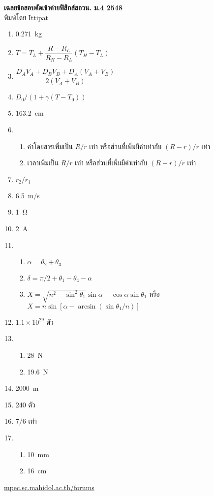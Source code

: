 \documentclass[a4paper,12pt]{article}
\begin{document}
\thispagestyle{empty}
\begin{center}
	{\huge \textbf{เฉลยข้อสอบคัดเข้าค่ายฟิสิกส์สอวน. ม.\textenglish{4} 2548}}\\
	พิมพ์โดย Ittipat\\
\end{center}
\begin{enumerate}
	\item \SI{0.271}{kg}
	\item \(T = T_L + \dfrac{R-R_L}{R_H - R_L} (T_H - T_L)\)
	\item \(\dfrac{D_AV_A + D_BV_B + D_A(V_A + V_B)}{2(V_A + V_B)}\)
	\item \(D_0/(1 + \gamma (T - T_0))\)
	\item \SI{163.2}{cm}
	\item \
	\begin{enumerate}
		\item ค่าโดยสารเพิ่มเป็น \(R/r\) เท่า หรือส่วนที่เพิ่มมีค่าเท่ากับ  \((R-r)/r\) เท่า
		\item เวลาเพิ่มเป็น \(R/r\) เท่า หรือส่วนที่เพิ่มมีค่าเท่ากับ  \((R-r)/r\) เท่า
	\end{enumerate}
	\item \(r_2/r_1\)
	\item \SI{6.5}{m/s}
	\item \SI{1}{\ohm}
	\item \SI{2}{A}
	\item \
	\begin{enumerate}
		\item \(\alpha = \theta_2 +\theta_3\)
		\item \(\delta = \pi/2 + \theta_1 - \theta_4 - \alpha\)
		\item \(X = \sqrt{n^2 -\sin^2 \theta_1} \sin \alpha - \cos \alpha \sin \theta_1\) หรือ \(X = n \sin[\alpha - \arcsin (\sin \theta_1 / n)]\)
	\end{enumerate}
	\item \(1.1\times10^{29}\) ตัว
	\item \
	\begin{enumerate}
		\item \SI{28}{N}
		\item \SI{19.6}{N}
	\end{enumerate}
	\item \SI{2000}{m}
	\item 240 ตัว
	\item \(7/6\) เท่า
	\item \
	\begin{enumerate}
		\item \SI{10}{mm}
		\item \SI{16}{cm}
	\end{enumerate}
\end{enumerate}
\vfill	
\begin{center}
	\href{http://mpec.sc.mahidol.ac.th/forums/}{mpec.sc.mahidol.ac.th/forums}
\end{center}
\end{document}
